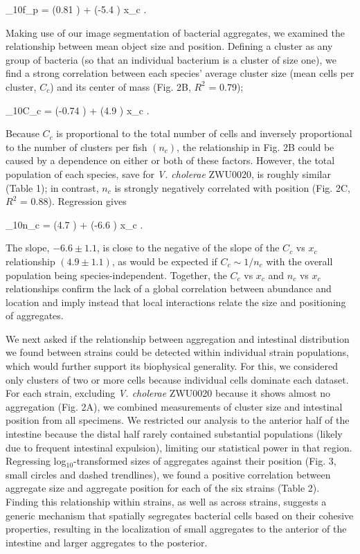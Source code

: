 \be
        	 \log_{10}f_p = (0.81 ) + (-5.4 ) x_c .	
\ee

Making use of our image segmentation of bacterial aggregates, we examined the relationship between mean object size and position. Defining a cluster as any group of bacteria (so that an individual bacterium is a cluster of size one), we find a strong correlation between each species' average cluster size (mean cells per cluster, $C_c$) and its center of mass (Fig. 2B, $R^2$ = 0.79);

\be
        	 \log_{10}C_c = (-0.74 ) + (4.9 ) x_c .
\ee	


Because $C_c$ is proportional to the total number of cells and inversely proportional to the number of clusters per fish $(n_c)$, the relationship in Fig. 2B could be caused by a dependence on either or both of these factors. However, the total population of each species, save for \textit{V. cholerae} ZWU0020, is roughly similar (Table 1); in contrast, $n_c$ is strongly negatively correlated with position (Fig. 2C, $R^2$ = 0.88). Regression gives

\be
        \log_{10}n_c = (4.7 ) + (-6.6 ) x_c .
\ee	

The slope, $-6.6 \pm 1.1$, is close to the negative of the slope of the $C_c$ vs $x_c$ relationship $(4.9 \pm 1.1)$, as would be expected if $C_c \sim 1/n_c$ with the overall population being species-independent. Together, the $C_c$ vs $x_c$  and $n_c$ vs $x_c$ relationships confirm the lack of a global correlation between abundance and location and imply instead that local interactions relate the size and positioning of aggregates. 	


We next asked if the relationship between aggregation and intestinal distribution we found between strains could be detected within individual strain populations, which would further support its biophysical generality. For this, we considered only clusters of two or more cells because individual cells dominate each dataset. For each strain, excluding \textit{V. cholerae} ZWU0020 because it shows almost no aggregation (Fig. 2A), we combined measurements of cluster size and intestinal position from all specimens. We restricted our analysis to the anterior half of the intestine because the distal half rarely contained substantial populations (likely due to frequent intestinal expulsion), limiting our statistical power in that region. Regressing log$_{10}$-transformed sizes of aggregates against their position (Fig. 3, small circles and dashed trendlines), we found a positive correlation between aggregate size and aggregate position for each of the six strains (Table 2). Finding this relationship within strains, as well as across strains, suggests a generic mechanism that spatially segregates bacterial cells based on their cohesive properties, resulting in the localization of small aggregates to the anterior of the intestine and larger aggregates to the posterior.

